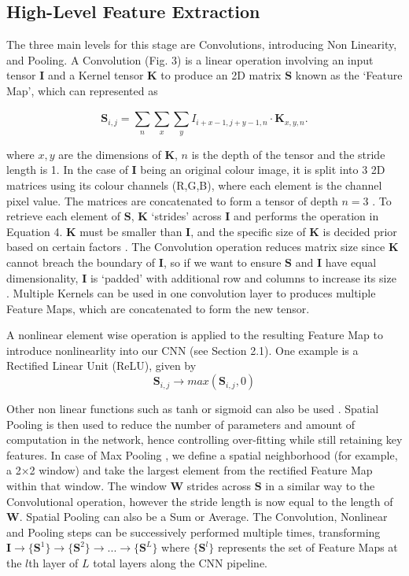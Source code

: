 \documentclass[11pt]{article}
\begin{document}
\subsection{High-Level Feature Extraction}
The three main levels for this stage are Convolutions, introducing Non Linearity, and Pooling. A Convolution (Fig. 3) is a linear operation involving an input tensor $\bm{I}$ and a Kernel tensor $\bm{K}$ to produce an 2D matrix $\bm{S}$ known as the `Feature Map', which can represented as

\begin{equation}
\bm{S}_{i, j}=\sum_{n}^{ }\sum_{x}^{ }\sum_{y}^{ }I_{i+x-1, j+y-1, n} \cdot \bm{K}_{x, y, n}.
\end{equation}

where $x, y$ are the dimensions of $\bm{K}$, $n$ is the depth of the tensor and the stride length is 1. In the case of $\bm{I}$ being an original colour image, it is split into 3 2D matrices using its colour channels (R,G,B), where each element is the channel pixel value. The matrices are concatenated to form a tensor of depth $n = 3$ . To retrieve each element of $\bm{S}$, $\bm{K}$ `strides' across $\bm{I}$ and performs the operation in Equation 4. $\bm{K}$ must be smaller than $\bm{I}$, and the specific size of $\bm{K}$ is decided prior based on certain factors \cite{sabyasachi}. The Convolution operation reduces matrix size since $\bm{K}$ cannot breach the boundary of $\bm{I}$, so if we want to ensure $\bm{S}$ and $\bm{I}$ have equal dimensionality, $\bm{I}$ is `padded' with additional row and columns to increase its size \cite{zhang2020dive}. Multiple Kernels can be used in one convolution layer to produces multiple Feature Maps, which are concatenated to form the new tensor. \newline

A nonlinear element wise operation is applied to the resulting Feature Map to introduce nonlinearlity into our CNN (see Section 2.1). One example is a Rectified Linear Unit (ReLU), given by 
\begin{equation}
\bm{S}_{i, j} \rightarrow max(\bm{S}_{i, j}, 0)
\end{equation}

Other non linear functions such as tanh or sigmoid can also be used \cite{chadha}. Spatial Pooling is then used to reduce the number of parameters and amount of computation in the network, hence controlling over-fitting while still retaining key features. In case of Max Pooling \cite{yamaguchi}, we define a spatial neighborhood (for example, a 2×2 window) and take the largest element from the rectified Feature Map within that window. The window $\bm{W}$ strides across $\bm{S}$ in a similar way to the Convolutional operation, however the stride length is now equal to the length of $\bm{W}$. Spatial Pooling can also be a Sum or Average. The Convolution, Nonlinear and Pooling steps can be successively performed multiple times, transforming $\bm{I} \rightarrow \{\bm{S}^1\} \rightarrow \{\bm{S}^2\} \rightarrow ... \rightarrow \{\bm{S}^L\}$ where $\{\bm{S}^l\}$ represents the set of Feature Maps at the $l$th layer of $L$ total layers along the CNN pipeline. 
\end{document}
